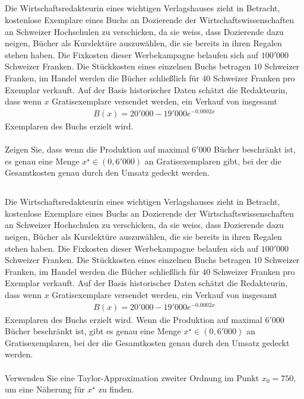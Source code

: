 \subsection*{} 
Die Wirtschaftsredakteurin eines wichtigen Verlagshauses zieht in Betracht,
kostenlose Exemplare eines Buchs an Dozierende der Wirtschaftswissenschaften an Schweizer Hochschulen zu verschicken, da sie weiss, dass Dozierende dazu neigen, Bücher als Kurslektüre auszuwählen, die sie bereits in ihren Regalen stehen haben. Die Fixkosten dieser Werbekampagne belaufen sich auf $100'000$ Schweizer Franken.
Die Stückkosten eines einzelnen Buchs betragen $10$ Schweizer Franken, im Handel werden die Bücher schließlich für $40$ Schweizer Franken pro Exemplar verkauft.
Auf der Basis historischer Daten schätzt die Redakteurin, dass wenn $x$ Gratisexemplare versendet werden, ein Verkauf von insgesamt
\begin{align*}
	B(x) = 20'000 - 19'000 e^{-0.0002 x }
\end{align*}
Exemplaren des Buchs erzielt wird. \\
\\
Zeigen Sie, dass wenn die Produktion auf maximal $6'000$ Bücher beschränkt ist, es genau eine Menge $ x^\star \in (0, 6'000)$ an Gratisexemplaren gibt, bei der die Gesamtkosten genau durch den Umsatz gedeckt werden.


\subsection*{}
Die Wirtschaftsredakteurin eines wichtigen Verlagshauses zieht in Betracht,
kostenlose Exemplare eines Buchs an Dozierende der Wirtschaftswissenschaften an Schweizer Hochschulen zu verschicken, da sie weiss, dass Dozierende dazu neigen, Bücher als Kurslektüre auszuwählen, die sie bereits in ihren Regalen stehen haben. Die Fixkosten dieser Werbekampagne belaufen sich auf $100'000$ Schweizer Franken.
Die Stückkosten eines einzelnen Buchs betragen $10$ Schweizer Franken, im Handel werden die Bücher schließlich für $40$ Schweizer Franken pro Exemplar verkauft.
Auf der Basis historischer Daten schätzt die Redakteurin, dass wenn $x$ Gratisexemplare versendet werden, ein Verkauf von insgesamt
\begin{align*}
	B(x) = 20'000 - 19'000 e^{-0.0002 x }
\end{align*}
Exemplaren des Buchs erzielt wird. Wenn die Produktion auf maximal $6'000$ Bücher beschränkt ist, gibt es genau eine Menge $ x^\star \in (0, 6'000)$ an Gratisexemplaren, bei der die Gesamtkosten genau durch den Umsatz gedeckt werden.\\
\\
Verwenden Sie eine Taylor-Approximation zweiter Ordnung im Punkt $x_0 = 750$, um eine Näherung für $x^\star$ zu finden.
 \\
\\
\newpage
